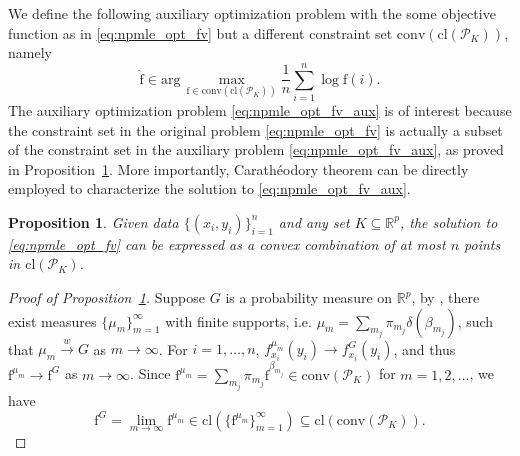 \documentclass[11pt]{article}
\numberwithin{equation}{section}
\newtheorem{proposition}{Proposition}[section]
\newcommand{\RS}{\mathbb{R}}
\newcommand{\PS}{\mathcal{P}}
\newcommand{\fv}{\mathrm{f}}
\begin{document}
\begin{appendices}
We define the following auxiliary optimization problem with the some objective function as in \eqref{eq:npmle_opt_fv} but a different constraint set $\mathrm{conv}(\mathrm{cl}(\PS_K))$, namely 
\begin{equation}
\hat{\fv} \in \mathrm{arg}\, \underset{\fv \in \mathrm{conv}(\mathrm{cl}(\PS_K))}{\max} \frac{1}{n} \sum_{i=1}^n \log \fv(i).
\label{eq:npmle_opt_fv_aux}
\end{equation}
The auxiliary optimization problem \eqref{eq:npmle_opt_fv_aux} is of interest because the constraint set in the original problem \eqref{eq:npmle_opt_fv} is actually a subset of the constraint set in the auxiliary problem \eqref{eq:npmle_opt_fv_aux}, as proved in Proposition~\ref{proposition:caratheodory}. More importantly, Carath\'eodory theorem can be directly employed to characterize the solution to \eqref{eq:npmle_opt_fv_aux}.

\begin{proposition}
\label{proposition:caratheodory}
Given data $\{ (x_i,y_i)\}_{i=1}^n$ and any set $K\subseteq \RS^p$, the solution to \eqref{eq:npmle_opt_fv} can be expressed as a convex combination of at most $n$ points in $\mathrm{cl}({\PS_K})$.
\end{proposition}
\begin{proof}[Proof of Proposition~\ref{proposition:caratheodory}]

Suppose $G$ is a probability measure on $\RS^p$, by \citet[Theorem 6.3]{parthasarathy2005probability}, there exist measures $\{ \mu_m\}_{m=1}^\infty$ with finite supports, i.e. $\mu_m = \sum_{m_j} \pi_{m_j} \delta(\beta_{m_j})$, such that $\mu_m \stackrel{w}{\rightarrow} G$ as $m\rightarrow \infty$. For $i=1,\dots,n$, $f^{\mu_m}_{x_i}(y_i) \rightarrow f^G_{x_i}(y_i)$, and thus $\fv^{\mu_m}  \rightarrow \fv^G$ as $m \rightarrow \infty$. Since $\fv^{\mu_m} = \sum_{m_j} \pi_{m_j} \fv^{\beta_{m_j}} \in \mathrm{conv}(\PS_K)$ for $m = 1,2,\dots $, we have
\[ 
\fv^G = \lim_{m\rightarrow \infty} \fv^{\mu_m} \in \mathrm{cl}(\{ \fv^{\mu_m}\}_{m=1}^\infty) \subseteq \mathrm{cl}(\mathrm{conv}(\PS_K)).
\]


\end{proof}
\end{appendices}
\end{document}
